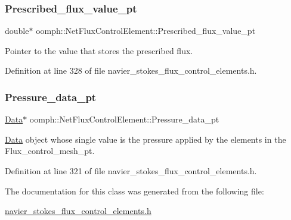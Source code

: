 \subsubsection{\texorpdfstring{Prescribed\+\_\+flux\+\_\+value\+\_\+pt}{Prescribed\_flux\_value\_pt}}
{\footnotesize\ttfamily double$\ast$ oomph\+::\+Net\+Flux\+Control\+Element\+::\+Prescribed\+\_\+flux\+\_\+value\+\_\+pt\hspace{0.3cm}{\ttfamily [private]}}



Pointer to the value that stores the prescribed flux. 



Definition at line 328 of file navier\+\_\+stokes\+\_\+flux\+\_\+control\+\_\+elements.\+h.

\mbox{\label{classoomph_1_1NetFluxControlElement_ae1c3f471f98f4c18f05c7a00a7c0489e}} 
\subsubsection{\texorpdfstring{Pressure\+\_\+data\+\_\+pt}{Pressure\_data\_pt}}
{\footnotesize\ttfamily \hyperlink{classoomph_1_1Data}{Data}$\ast$ oomph\+::\+Net\+Flux\+Control\+Element\+::\+Pressure\+\_\+data\+\_\+pt\hspace{0.3cm}{\ttfamily [private]}}



\hyperlink{classoomph_1_1Data}{Data} object whose single value is the pressure applied by the elements in the Flux\+\_\+control\+\_\+mesh\+\_\+pt. 



Definition at line 321 of file navier\+\_\+stokes\+\_\+flux\+\_\+control\+\_\+elements.\+h.



The documentation for this class was generated from the following file\+:\begin{DoxyCompactItemize}
\item 
\hyperlink{navier__stokes__flux__control__elements_8h}{navier\+\_\+stokes\+\_\+flux\+\_\+control\+\_\+elements.\+h}\end{DoxyCompactItemize}
